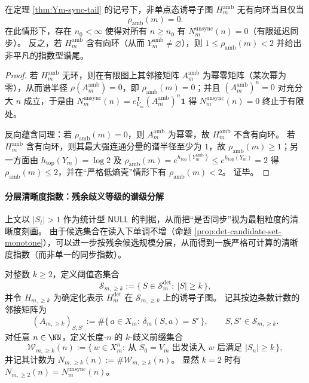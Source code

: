 \begin{corollary}[有限延迟与谱尾的严格二分]\label{cor:Ym-finite-delay-spectral-tail}
在定理 \ref{thm:Ym-sync-tail} 的记号下，非单点态诱导子图 \(H_m^{\mathrm{amb}}\) 无有向环当且仅当
\[
\rho_{\mathrm{amb}}(m)=0.
\]
在此情形下，存在 \(n_0<\infty\) 使得对所有 \(n\ge n_0\) 有 \(N_m^{\mathrm{unsync}}(n)=0\)（有限延迟同步）。
反之，若 \(H_m^{\mathrm{amb}}\) 含有向环（从而 \(Y_m^{\mathrm{amb}}\neq\varnothing\)），则 \(1\le \rho_{\mathrm{amb}}(m)<2\) 并给出非平凡的指数型谱尾。
\end{corollary}

\begin{proof}
若 \(H_m^{\mathrm{amb}}\) 无环，则在有限图上其邻接矩阵 \(A_m^{\mathrm{amb}}\) 为幂零矩阵（某次幂为零），从而谱半径 \(\rho(A_m^{\mathrm{amb}})=0\)，即 \(\rho_{\mathrm{amb}}(m)=0\)；并且 \((A_m^{\mathrm{amb}})^n=0\) 对充分大 \(n\) 成立，于是由
\(
N_m^{\mathrm{unsync}}(n)=e_{V_m}^{\mathsf T}(A_m^{\mathrm{amb}})^n\mathbf 1
\)
得 \(N_m^{\mathrm{unsync}}(n)=0\) 终止于有限处。
\par
反向蕴含同理：若 \(\rho_{\mathrm{amb}}(m)=0\)，则 \(A_m^{\mathrm{amb}}\) 为幂零，故 \(H_m^{\mathrm{amb}}\) 不含有向环。
若 \(H_m^{\mathrm{amb}}\) 含有向环，则其最大强连通分量的谱半径至少为 \(1\)，故 \(\rho_{\mathrm{amb}}(m)\ge 1\)；另一方面由 \(h_{\mathrm{top}}(Y_m)=\log 2\) 及 \(\rho_{\mathrm{amb}}(m)=e^{h_{\mathrm{top}}(Y_m^{\mathrm{amb}})}\le e^{h_{\mathrm{top}}(Y_m)}=2\) 得 \(\rho_{\mathrm{amb}}(m)\le 2\)，并在“严格低熵壳”情形下有 \(\rho_{\mathrm{amb}}(m)<2\)。
证毕。
\end{proof}

\paragraph{分层清晰度指数：残余歧义等级的谱级分解}
上文以 \(|S_t|>1\) 作为统计型 \(\mathsf{NULL}\) 的判据，从而把“是否同步”视为最粗粒度的清晰度刻画。
由于候选集合在读入下单调不增（命题 \ref{prop:det-candidate-set-monotone}），可以进一步按残余候选规模分层，从而得到一族严格可计算的清晰度指数（而非单一的同步指数）。

\begin{definition}[残余歧义等级与诱导计数图]\label{def:Ym-ambiguity-level-k}
对整数 \(k\ge 2\)，定义阈值态集合
\[
\mathcal{S}_{m,\ge k}:=\{\,S\in\mathcal{S}_m^{\mathrm{det}}:\ |S|\ge k\,\},
\]
并令 \(H_{m,\ge k}\) 为确定化表示 \(H_m^{\mathrm{det}}\) 在 \(\mathcal{S}_{m,\ge k}\) 上的诱导子图。
记其按边条数计数的邻接矩阵为
\[
(A_{m,\ge k})_{S,S'}:=\#\{\,a\in X_m:\ \delta_m(S,a)=S'\,\},\qquad S,S'\in\mathcal{S}_{m,\ge k}.
\]
对任意 \(n\in\NN\)，定义长度-\(n\) 的 \(k\)-歧义前缀集合
\[
\mathcal{W}_{m,\ge k}(n)
:=\{\,w\in X_m^n:\ \text{从 }S_0=V_m\text{ 出发读入 }w\text{ 后满足 }|S_n|\ge k\,\},
\]
并记其计数为 \(N_{m,\ge k}(n):=\#\mathcal{W}_{m,\ge k}(n)\)。
显然 \(k=2\) 时有 \(N_{m,\ge 2}(n)=N_m^{\mathrm{unsync}}(n)\)。
\end{definition}

